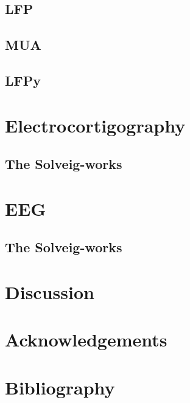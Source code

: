 \documentclass[preprint,11pt,authoryear]{elsarticle}
\begin{document}
\subsection{LFP}

\subsection{MUA}

\subsection{LFPy}


\section{Electrocortigography}

\subsection{The Solveig-works}


\section{EEG}

\subsection{The Solveig-works}
 
\section{Discussion}
\label{sec:discussion}




\section{Acknowledgements}
\label{sec:acknowledgements}





\section{Bibliography}
\label{sec:bibliography}



\end{document}

